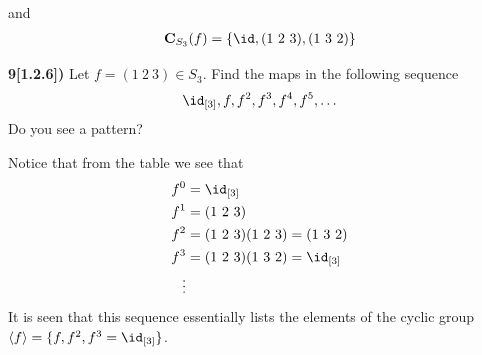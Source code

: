 \documentclass[12pt,a4paper]{article}
\newcommand{\prob}[2]{\textbf{#1)} #2}
\begin{document}
and 
\begin{align*}
\mathbf{C}_{S_3}(f) = \{\id,(1~2~3),(1~3~2)\}
\end{align*}

\prob{9[1.2.6]}{Let $f = (1~2~3) \in S_3$. Find the maps in the following sequence
\begin{align*}
\id_{[3]},f,f^2,f^3,f^4,f^5,\hdots
\end{align*}
Do you see a pattern?}

Notice that from the table we see that
\begin{align*}
f^{0} &= \id_{[3]} \\
f^{1} &= (1~2~3) \\
f^{2} &= (1~2~3)(1~2~3) = (1~3~2) \\
f^{3} &= (1~2~3)(1~3~2) = \id_{[3]} \\
\vdots
\end{align*}
It is seen that this sequence essentially lists the elements of the cyclic group $\langle f \rangle = \{f,f^2,f^3=\id_{[3]}\}$.
\end{document}
